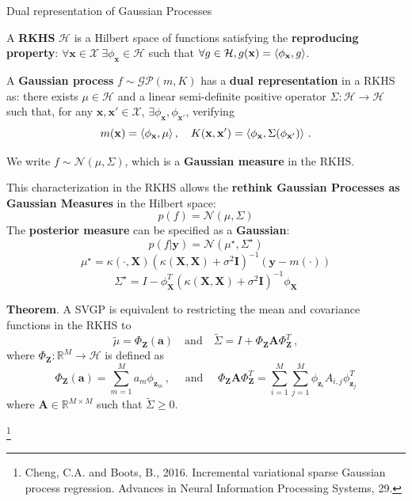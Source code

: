 \documentclass[aspectratio=149]{beamer}
\begin{document}
    \begin{frame}{Dual representation of Gaussian Processes}

        A \textbf{RKHS} \(\mathcal{H}\) is a Hilbert space of functions satisfying the \textbf{reproducing property}: \(\forall \mathbf{x} \in \mathcal{X} \ \exists \phi_{\mathbf{x}} \in \mathcal{H}\) such that \(\forall g \in \mathcal{H}, g(\mathbf{x}) = \braket{\phi_{\mathbf{x}}, g} \).
        
        \pause
        
        A \textbf{Gaussian process} \(f\sim \mathcal{GP}(m, K)\) has a \textbf{dual representation} in a RKHS as: there exists \(\mu \in \mathcal{H}\) and a linear semi-definite positive operator \(\Sigma:\mathcal{H} \to \mathcal{H}\) such that, for any \(\mathbf{x}, \mathbf{x}' \in \mathcal{X}\), \(\exists \phi_{\mathbf{x}}, \phi_{\mathbf{x}'}\), verifying
        \[
            m(\mathbf{x}) = \braket{\phi_{\mathbf{x}}, \mu}, \quad K(\mathbf{x}, \mathbf{x}') = \braket{\phi_{\mathbf{x}}, \Sigma(\phi_{\mathbf{x}'})}\,.
        \]
        
        \pause 
        
        We write \(f \sim \mathcal{N}(\mu, \Sigma)\), which is a \textbf{Gaussian measure} in the RKHS.
    \end{frame}

    \begin{frame}
        This characterization in the RKHS allows the \textbf{rethink Gaussian Processes as Gaussian Measures} in the Hilbert space:
        \[
        p(f) = \mathcal{N}(\mu, \Sigma)
        \]
        \pause
        The \textbf{posterior measure} can be specified as a \textbf{Gaussian}:
        \[
        p(f|\mathbf{y}) = \mathcal{N}(\mu^\star, \Sigma^\star)
        \]
        \vspace{0.2cm}
        \[
        \mu^\star = \kappa(\cdot, \mathbf{X})(\kappa(\mathbf{X}, \mathbf{X}) + \sigma^2 \bm{I})^{-1}(\mathbf{y} - m(\cdot))
        \]
        \[
        \Sigma^\star = I - \phi_{\mathbf{X}}^T(\kappa(\mathbf{X}, \mathbf{X}) + \sigma^2 \bm{I})^{-1}\phi_{\mathbf{X}}
        \]
    \end{frame}

    \begin{frame}
        \textbf{Theorem}. A SVGP is equivalent to restricting the mean and covariance functions in the RKHS to
        \[
            \tilde{\mu} = \Phi_{\mathbf{Z}}(\bm{a}) \quad \text{and} \quad \tilde{\Sigma} = I + \Phi_{\mathbf{Z}}\bm{A}\Phi_{\mathbf{Z}}^T\,,
        \]
        where \(\Phi_{\mathbf{Z}}: \mathbb{R}^M \to \mathcal{H} \) is defined as 
        \[\Phi_{\mathbf{Z}}(\bm{a}) = \sum_{m=1}^{M} a_m \phi_{\mathbf{z}_m}\,, \quad\text{ and }\quad \Phi_{\mathbf{Z}}\bm{A}\Phi_{\mathbf{Z}}^T= \sum_{i=1}^{M}\sum_{j=1}^M\phi_{\mathbf{z}_i} A_{i,j} \phi_{\mathbf{z}_j}^T
        \]
        where \(\bm{A} \in \mathbb{R}^{M\times M}\) such that \(\tilde{\Sigma} \geq 0\).

    {\let\thefootnote\relax\footnote{{Cheng, C.A. and Boots, B., 2016. Incremental variational sparse Gaussian process regression. Advances in Neural Information Processing Systems, 29.}}}
    \end{frame}
\end{document}
